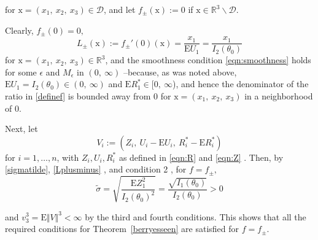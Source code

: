 for $\mathrm{x}=(x_{1},\ x_{2},\ x_{3})\in \mathcal{D}$, and let $f_{\pm}(\mathrm{x}) :=0$ if $\mathrm{x}\in \mathbb{R}^{3}\backslash \mathcal{D}$. 

Clearly, $f_{\pm}(0)=0,$
\begin{equation}\label{Lplusminus}
	L_{\pm}(\displaystyle \mathrm{x}):=f_{\pm}'(0)(\mathrm{x})=\frac{x_{1}}{\mathrm{E}U_{1}}=\frac{x_{1}}{I_2(\theta_{0})}
\end{equation}
for $\mathrm{x}=(x_{1},\ x_{2},\ x_{3})\in \mathbb{R}^{3}$, and the smoothness condition \eqref{eqn:smoothness} holds for some $\epsilon$ and $M_{\epsilon}$ in $(0,\ \infty)$ --because, as was noted above, $\mathrm{E}U_{1}=I_2(\theta_{0})\in(0,\ \infty)$ and $\mathrm{E}R_{1}^{*}\in[0,\ \infty$), and hence the denominator of the ratio in \eqref{definef} is bounded away from $0$ for $\mathrm{x}=(x_{1},\ x_{2},\ x_{3})$ in a neighborhood of $0.$

Next, let
\begin{equation}\label{Vi}
	V_{i}:=(Z_{i},\ U_{i}-\mathrm{E}U_{i},\ R_{i}^{*}-\mathrm{E}R_{i}^{*})
\end{equation}
for $i=1,\ldots,n$, with $Z_{i}, U_{i}, R_{i}^{*}$ as defined in \eqref{eqn:R} and \eqref{eqn:Z} . Then, by \eqref{sigmatilde}, \eqref{Lplusminus} , and condition 2 , for $f=f_{\pm},$
\begin{equation}\label{sigmatilde1}
	\tilde{\sigma} = \sqrt{\frac{\mathrm{E}Z_{1}^{2}}{I_2(\theta_{0})^{2}}}=\frac{\sqrt{I_1(\theta_0)}}{I_2(\theta_{0})}>0
\end{equation}

and $ v_{3}^{3}=\mathrm{E}\Vert V\Vert^{3}<\infty$ by the third and fourth conditions. This shows that all the required conditions for Theorem~\ref{berryesseen} are satisfied for $f=f_{\pm}$.

